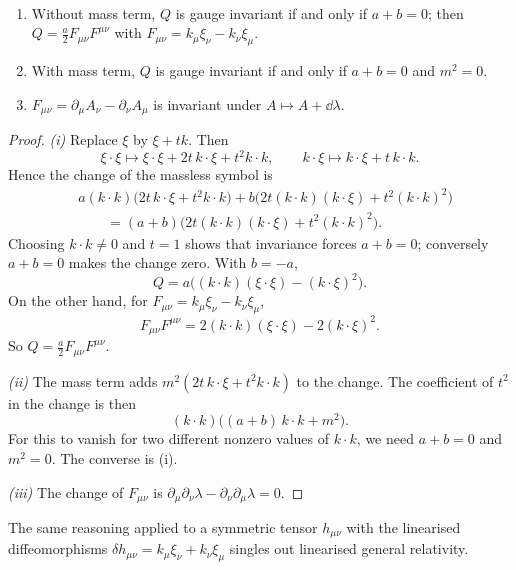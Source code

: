 \begin{theorem}\label{thm:maxwellunique}\ver\
\begin{enumerate}[label=(\roman*)]
\item Without mass term, $Q$ is gauge invariant if and only if $a+b=0$; then $Q=\frac a2F_{\mu\nu}F^{\mu\nu}$ with $F_{\mu\nu}=k_\mu\xi_\nu-k_\nu\xi_\mu$.
\item With mass term, $Q$ is gauge invariant if and only if $a+b=0$ and $m^2=0$.
\item $F_{\mu\nu}=\partial_\mu A_\nu-\partial_\nu A_\mu$ is invariant under $A\mapsto A+\dd\lambda$.
\end{enumerate}
\end{theorem}
\begin{proof}
\emph{(i)} Replace $\xi$ by $\xi+tk$. Then
\[
\xi\cdot\xi\mapsto\xi\cdot\xi+2t\,k\cdot\xi+t^2k\cdot k,\qquad k\cdot\xi\mapsto k\cdot\xi+t\,k\cdot k .
\]
Hence the change of the massless symbol is
\[
\begin{aligned}
&a(k\cdot k)\bigl(2t\,k\cdot\xi+t^2k\cdot k\bigr)+b\bigl(2t(k\cdot k)(k\cdot\xi)+t^2(k\cdot k)^2\bigr)\\
&\qquad=(a+b)\bigl(2t(k\cdot k)(k\cdot\xi)+t^2(k\cdot k)^2\bigr).
\end{aligned}
\]
Choosing $k\cdot k\ne0$ and $t=1$ shows that invariance forces $a+b=0$; conversely $a+b=0$ makes the change zero. With $b=-a$,
\[
Q=a\bigl((k\cdot k)(\xi\cdot\xi)-(k\cdot\xi)^2\bigr).
\]
On the other hand, for $F_{\mu\nu}=k_\mu\xi_\nu-k_\nu\xi_\mu$,
\[
F_{\mu\nu}F^{\mu\nu}=2(k\cdot k)(\xi\cdot\xi)-2(k\cdot\xi)^2 .
\]
So $Q=\frac a2F_{\mu\nu}F^{\mu\nu}$.

\emph{(ii)} The mass term adds $m^2(2t\,k\cdot\xi+t^2k\cdot k)$ to the change. The coefficient of $t^2$ in the change is then
\[
(k\cdot k)\bigl((a+b)\,k\cdot k+m^2\bigr).
\]
For this to vanish for two different nonzero values of $k\cdot k$, we need $a+b=0$ and $m^2=0$. The converse is (i).

\emph{(iii)} The change of $F_{\mu\nu}$ is $\partial_\mu\partial_\nu\lambda-\partial_\nu\partial_\mu\lambda=0$.
\end{proof}


The same reasoning applied to a symmetric tensor $h_{\mu\nu}$ with the linearised diffeomorphisms $\delta h_{\mu\nu}=k_\mu\xi_\nu+k_\nu\xi_\mu$ singles out linearised general relativity.

